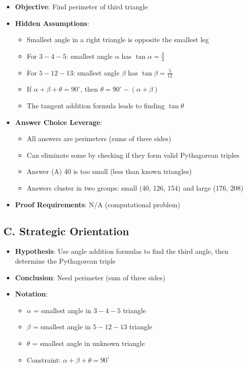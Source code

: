 \documentclass[12pt]{article}
\begin{document}
\begin{problemconfigbox}
\begin{itemize}[leftmargin=*]
    \item \textbf{Objective}: Find perimeter of third triangle
    
    \item \textbf{Hidden Assumptions}: 
    \begin{itemize}
        \item Smallest angle in a right triangle is opposite the smallest leg
        \item For $3-4-5$: smallest angle $\alpha$ has $\tan\alpha = \frac{3}{4}$
        \item For $5-12-13$: smallest angle $\beta$ has $\tan\beta = \frac{5}{12}$
        \item If $\alpha + \beta + \theta = 90^{\circ}$, then $\theta = 90^{\circ} - (\alpha + \beta)$
        \item The tangent addition formula leads to finding $\tan\theta$
    \end{itemize}
    
    \item \textbf{Answer Choice Leverage}: 
    \begin{itemize}
        \item All answers are perimeters (sums of three sides)
        \item Can eliminate some by checking if they form valid Pythagorean triples
        \item Answer (A) 40 is too small (less than known triangles)
        \item Answers cluster in two groups: small (40, 126, 154) and large (176, 208)
    \end{itemize}
    
    \item \textbf{Proof Requirements}: N/A (computational problem)
\end{itemize}

\subsection*{C. Strategic Orientation}
\begin{itemize}[leftmargin=*]
    \item \textbf{Hypothesis}: Use angle addition formulas to find the third angle, then determine the Pythagorean triple
    
    \item \textbf{Conclusion}: Need perimeter (sum of three sides)
    
    \item \textbf{Notation}: 
    \begin{itemize}
        \item $\alpha$ = smallest angle in $3-4-5$ triangle
        \item $\beta$ = smallest angle in $5-12-13$ triangle
        \item $\theta$ = smallest angle in unknown triangle
        \item Constraint: $\alpha + \beta + \theta = 90^{\circ}$
    \end{itemize}
    

\end{itemize}
\end{problemconfigbox}
\end{document}
